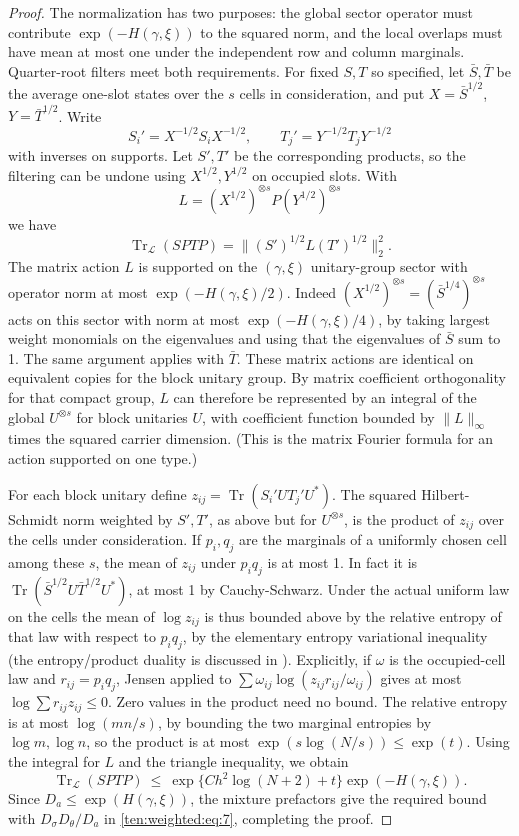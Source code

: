 \begin{proof}
The normalization has two purposes: the global sector operator must contribute $\exp(-H(\gamma,\xi))$ to the squared norm, and the local overlaps must have mean at most one under the independent row and column marginals. Quarter-root filters meet both requirements. For fixed \(S,T\) so specified, let \(\bar S,\bar T\) be the average one-slot states over the \(s\) cells in consideration, and put \(X=\bar S^{1/2}\), \(Y=\bar T^{1/2}\). Write
\[
 S_i'=X^{-1/2} S_i X^{-1/2},\qquad T_j'=Y^{-1/2}T_jY^{-1/2}
\]
with inverses on supports. Let \(S',T'\) be the corresponding products, so the filtering can be undone using \(X^{1/2},Y^{1/2}\) on occupied slots. With
\[
 L=(X^{1/2})^{\otimes s} P (Y^{1/2})^{\otimes s}
\]
we have
\[
 \operatorname{Tr}_{\mathcal L}(S P T P)=\|(S')^{1/2} L (T')^{1/2}\|_2^2 .
\]
The matrix action \(L\) is supported on the \((\gamma,\xi)\) unitary-group sector with operator norm at most \(\exp(-H(\gamma,\xi)/2)\). Indeed \((X^{1/2})^{\otimes s}=(\bar S^{1/4})^{\otimes s}\) acts on this sector with norm at most \(\exp(-H(\gamma,\xi)/4)\), by taking largest weight monomials on the eigenvalues and using that the eigenvalues of \(\bar S\) sum to 1. The same argument applies with \(\bar T\). These matrix actions are identical on equivalent copies for the block unitary group. By matrix coefficient orthogonality for that compact group, \(L\) can therefore be represented by an integral of the global \(U^{\otimes s}\) for block unitaries \(U\), with coefficient function bounded by \(\|L\|_\infty\) times the squared carrier dimension. (This is the matrix Fourier formula for an action supported on one type.)

For each block unitary define \(z_{ij}=\operatorname{Tr}(S_i' U T_j' U^*)\). The squared Hilbert-Schmidt norm weighted by \(S',T'\), as above but for \(U^{\otimes s}\), is the product of \(z_{ij}\) over the cells under consideration. If \(p_i,q_j\) are the marginals of a uniformly chosen cell among these \(s\), the mean of \(z_{ij}\) under \(p_i q_j\) is at most 1. In fact it is \(\operatorname{Tr}(\bar S^{1/2} U\bar T^{1/2}U^*)\), at most 1 by Cauchy-Schwarz. Under the actual uniform law on the cells the mean of \(\log z_{ij}\) is thus bounded above by the relative entropy of that law with respect to \(p_i q_j\), by the elementary entropy variational inequality (the entropy/product duality is discussed in \cite[Theorem~2.1 and (2.4)]{CarlenCorderoErausquin2009}). Explicitly, if $\omega$ is the occupied-cell law and $r_{ij}=p_iq_j$, Jensen applied to $\sum\omega_{ij}\log(z_{ij}r_{ij}/\omega_{ij})$ gives at most $\log\sum r_{ij}z_{ij}\le0$. Zero values in the product need no bound. The relative entropy is at most \(\log(mn/s)\), by bounding the two marginal entropies by \(\log m,\log n\), so the product is at most \(\exp(s\log(N/s))\le\exp(t)\). Using the integral for \(L\) and the triangle inequality, we obtain
\[
 \operatorname{Tr}_{\mathcal L}(S P T P)
 \ \le\ \exp\{C h^2\log(N+2)+t\}\exp(-H(\gamma,\xi)).
\]
Since \(D_a\le\exp(H(\gamma,\xi))\), the mixture prefactors give the required bound with \(D_\sigma D_\theta/D_a\) in \eqref{ten:weighted:eq:7}, completing the proof.
\end{proof}


